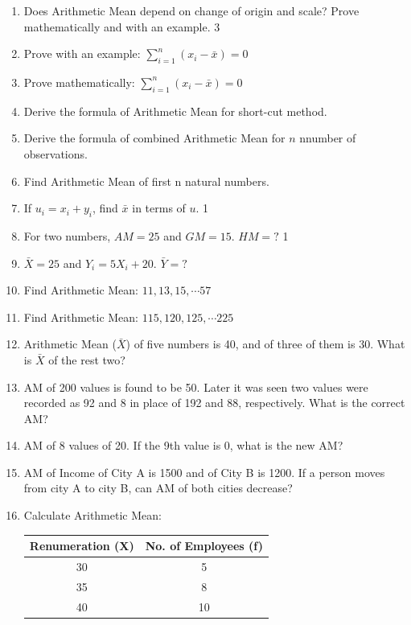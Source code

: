 \documentclass[a4paper,oneside]{book}
\begin{document}
\begin{enumerate}
    \item Does Arithmetic Mean depend on change of origin and scale? Prove mathematically and with an example. \hfill 3
    \item Prove with an example: $\displaystyle \sum_{i=1}^n (x_i-\bar x) = 0$
    \item Prove mathematically: $\displaystyle \sum_{i=1}^n (x_i-\bar x) = 0$
    \item Derive the formula of Arithmetic Mean for short-cut method.
    \item Derive the formula of combined Arithmetic Mean for $n$ nnumber of observations.
    \item Find Arithmetic Mean of first n natural numbers.
    \item If $u_i = x_i + y_i$, find $\bar x$ in terms of $u$. \hfill 1
    \item For two numbers, $AM=25$ and $GM=15$. $HM=?$ \hfill 1
    \item $\bar X = 25$ and $Y_i = 5X_i + 20$. $\bar Y = ?$
    \item Find Arithmetic Mean: $11,13,15, \cdots 57$
    \item Find Arithmetic Mean: $115,120,125, \cdots 225$
    \item Arithmetic Mean ($\bar X$) of five numbers is 40, and of three of them is 30. What is $\bar X$ of the rest two?
    \item AM of 200 values is found to be 50. Later it was seen two values were recorded as 92 and 8 in place of 192 and 88, respectively. What is the correct AM?
    \item AM of 8 values of 20. If the 9th value is 0, what is the new AM?
    \item AM of Income of City A is 1500 and of City B is 1200. If a person moves from city A to city B, can AM of both cities decrease?
    \item Calculate Arithmetic Mean:
    
    \begin{table}[h]
    \centering
\begin{tabular}{c|c}
\textbf{Renumeration (X)} & \textbf{No. of Employees (f)} \\ \hline
30               & 5                    \\ \hline
35               & 8                    \\ \hline
40               & 10                  
\end{tabular}
\end{table}
    

\end{enumerate}
\end{document}
